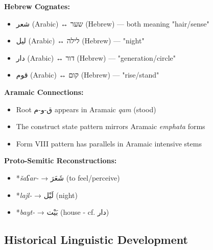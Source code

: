 \documentclass[letterpaper,12pt]{article}
\begin{document}
\begin{tcolorbox}[colback=boxcolor,colframe=dialectcolor,title=\textbf{Semitic Language Connections},breakable]
\textbf{Hebrew Cognates:}
\begin{itemize}
\item \textarabic{شعر} (Arabic) ↔ \texthebrew{שער} (Hebrew) — both meaning "hair/sense"
\item \textarabic{ليل} (Arabic) ↔ \texthebrew{לילה} (Hebrew) — "night"
\item \textarabic{دار} (Arabic) ↔ \texthebrew{דור} (Hebrew) — "generation/circle"
\item \textarabic{قوم} (Arabic) ↔ \texthebrew{קום} (Hebrew) — "rise/stand"
\end{itemize}

\textbf{Aramaic Connections:}
\begin{itemize}
\item Root \textarabic{ق-و-م} appears in Aramaic \textit{qam} (stood)
\item The construct state pattern mirrors Aramaic \textit{emphata} forms
\item Form VIII pattern has parallels in Aramaic intensive stems
\end{itemize}

\textbf{Proto-Semitic Reconstructions:}
\begin{itemize}
\item *\textit{šaʕar-} → \textarabic{شَعَرَ} (to feel/perceive)
\item *\textit{lajl-} → \textarabic{لَيْل} (night)
\item *\textit{bayt-} → \textarabic{بَيْت} (house - cf. \textarabic{دار})
\end{itemize}
\end{tcolorbox}

\subsection{Historical Linguistic Development}
\end{document}
